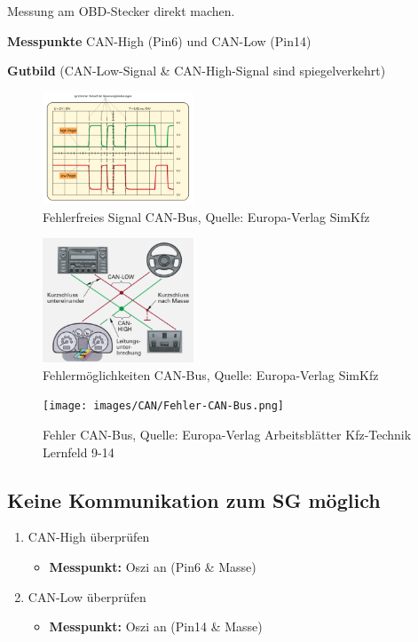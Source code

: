 Messung am OBD-Stecker direkt machen.

\textbf{Messpunkte} CAN-High (Pin6) und CAN-Low (Pin14)

\textbf{Gutbild} (CAN-Low-Signal \& CAN-High-Signal sind
spiegelverkehrt)

\begin{figure}[!ht]%
\centering
\includegraphics[width=0.4\textwidth]{images/CAN/Fehlerfreies-Signal-CAN-Bus.png}
\caption{Fehlerfreies Signal CAN-Bus, Quelle: Europa-Verlag SimKfz}
\end{figure}

\begin{figure}[!ht]%
\centering
\includegraphics[width=0.4\textwidth]{images/CAN/Fehlermoeglichkeiten-CAN-Bus.png}
\caption{Fehlermöglichkeiten CAN-Bus, Quelle: Europa-Verlag SimKfz}
\end{figure}

\begin{figure}[!ht]%
\centering
\texttt{[image: images/CAN/Fehler-CAN-Bus.png]}
\caption{Fehler CAN-Bus, Quelle: Europa-Verlag Arbeitsblätter
Kfz-Technik Lernfeld 9-14}
\end{figure}

\newpage

\subsection{Keine Kommunikation zum SG
möglich}\label{keine-kommunikation-zum-sg-moeglich}

\begin{enumerate}
\item
  CAN-High überprüfen

  \begin{itemize}
  \item
    \textbf{Messpunkt:} Oszi an (Pin6 \& Masse)
  \end{itemize}
\item
  CAN-Low überprüfen

  \begin{itemize}
  \item
    \textbf{Messpunkt:} Oszi an (Pin14 \& Masse)
  \end{itemize}
\end{enumerate}

